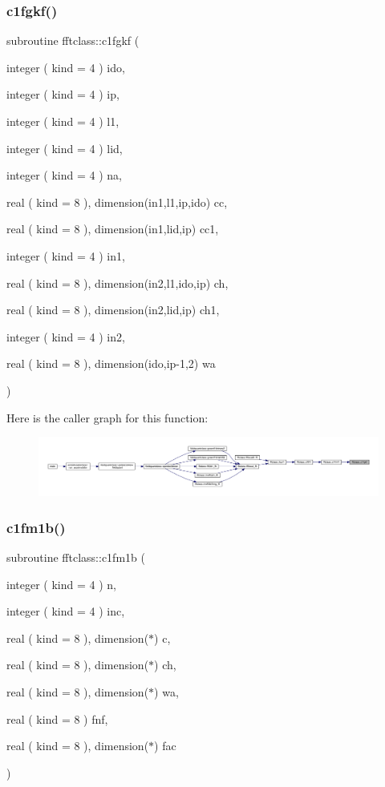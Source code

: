 \subsubsection{\texorpdfstring{c1fgkf()}{c1fgkf()}}
{\footnotesize\ttfamily subroutine fftclass\+::c1fgkf (\begin{DoxyParamCaption}\item[{integer ( kind = 4 )}]{ido,  }\item[{integer ( kind = 4 )}]{ip,  }\item[{integer ( kind = 4 )}]{l1,  }\item[{integer ( kind = 4 )}]{lid,  }\item[{integer ( kind = 4 )}]{na,  }\item[{real ( kind = 8 ), dimension(in1,l1,ip,ido)}]{cc,  }\item[{real ( kind = 8 ), dimension(in1,lid,ip)}]{cc1,  }\item[{integer ( kind = 4 )}]{in1,  }\item[{real ( kind = 8 ), dimension(in2,l1,ido,ip)}]{ch,  }\item[{real ( kind = 8 ), dimension(in2,lid,ip)}]{ch1,  }\item[{integer ( kind = 4 )}]{in2,  }\item[{real ( kind = 8 ), dimension(ido,ip-\/1,2)}]{wa }\end{DoxyParamCaption})}

Here is the caller graph for this function\+:\nopagebreak
\begin{figure}[H]
\begin{center}
\leavevmode
\includegraphics[width=350pt]{namespacefftclass_aa48f7f35412e5994c6fe459ad6f8c46d_icgraph}
\end{center}
\end{figure}
\mbox{\label{namespacefftclass_a2f5368919279e1986ee34764caa05fe0}} 
\subsubsection{\texorpdfstring{c1fm1b()}{c1fm1b()}}
{\footnotesize\ttfamily subroutine fftclass\+::c1fm1b (\begin{DoxyParamCaption}\item[{integer ( kind = 4 )}]{n,  }\item[{integer ( kind = 4 )}]{inc,  }\item[{real ( kind = 8 ), dimension($\ast$)}]{c,  }\item[{real ( kind = 8 ), dimension($\ast$)}]{ch,  }\item[{real ( kind = 8 ), dimension($\ast$)}]{wa,  }\item[{real ( kind = 8 )}]{fnf,  }\item[{real ( kind = 8 ), dimension($\ast$)}]{fac }\end{DoxyParamCaption})}

